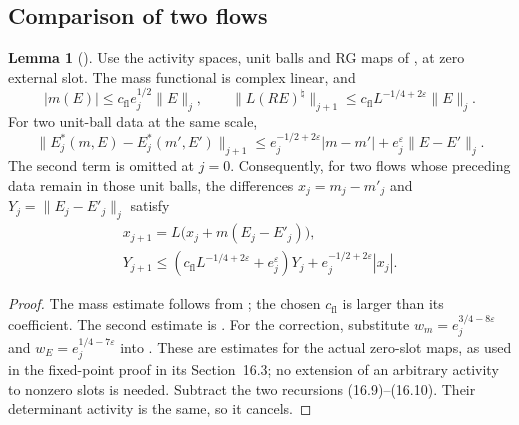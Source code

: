 \documentclass[11pt,letterpaper,reqno]{amsart}
\theoremstyle{definition}
\newtheorem{qcmlemma}[qcmproposition]{Lemma}
\newenvironment{lemma}[1][]{\pushQED{\qed}\renewcommand{\qedsymbol}{$\blacksquare$}\begin{qcmlemma}[#1]}{\popQED\end{qcmlemma}}
\begin{document}
\subsection{Comparison of two flows}
\begin{lemma}\label{qcm:one-slot-flow-bounds}
Use the activity spaces, unit balls and RG maps of
\cite[Sections~12.1, 14.7 and~16.2]{QEDConstruction}, at zero
external slot. The mass functional is complex linear, and
\[
 |m(E)|\le c_{\mathrm{fl}}e_j^{1/2}\|E\|_j,
 \qquad
 \|L(RE)^\natural\|_{j+1}
   \le c_{\mathrm{fl}}L^{-1/4+2\varepsilon}\|E\|_j.
\]
For two unit-ball data at the same scale,
\[
 \|E_j^*(m,E)-E_j^*(m',E')\|_{j+1}
 \le e_j^{-1/2+2\varepsilon}|m-m'|
          +e_j^\varepsilon\|E-E'\|_j.
\]
The second term is omitted at $j=0$. Consequently, for two
flows whose preceding data remain in those unit balls, the
differences $x_j=m_j-m'_j$ and $Y_j=\|E_j-E'_j\|_j$ satisfy
\begin{gather*}
 x_{j+1}=L\bigl(x_j+m(E_j-E'_j)\bigr),\\
 Y_{j+1}\le
 (c_{\mathrm{fl}}L^{-1/4+2\varepsilon}+e_j^\varepsilon)Y_j
                 +e_j^{-1/2+2\varepsilon}|x_j|.
\end{gather*}
\end{lemma}
\begin{proof}
The mass estimate follows from
\cite[Proposition~12.1, equation~(12.12)]{QEDConstruction};
the chosen $c_{\mathrm{fl}}$ is larger than its coefficient.
The second estimate is
\cite[Proposition~12.5, equation~(12.62)]{QEDConstruction}.
For the correction, substitute
$w_m=e_j^{3/4-8\varepsilon}$ and
$w_E=e_j^{1/4-7\varepsilon}$ into
\cite[Proposition~14.7, equation~(14.41)]{QEDConstruction}.
These are estimates for the actual zero-slot maps, as used
in the fixed-point proof in its Section~16.3; no extension of
an arbitrary activity to nonzero slots is needed.
Subtract the two recursions (16.9)--(16.10).
Their determinant activity is the same, so it cancels.
\end{proof}
\end{document}
